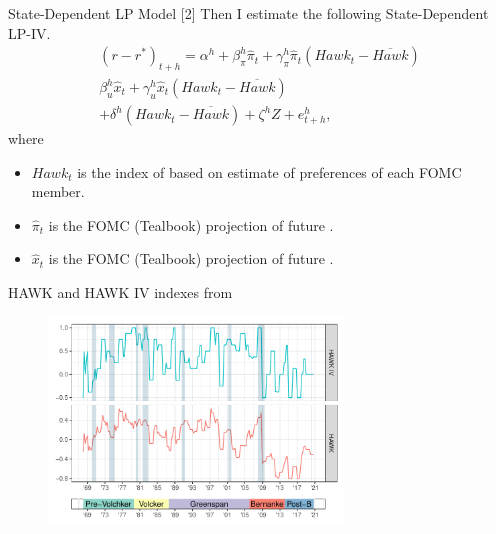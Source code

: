 \documentclass[10pt,aspectratio=169]{beamer}
\begin{document}
\begin{frame}{State-Dependent LP Model [2]}
    Then I estimate the following State-Dependent LP-IV.
    \begin{multline*}
        \left(r-r^*\right)_{t+h}=\alpha^h+\beta_\pi^h \hat\pi_t+\gamma_\pi^h \hat\pi_t\left(\mathit{Hawk}_{t}-\overline{\mathit{Hawk}}\right)\\ \beta_u^h \hat x_t+\gamma_u^h \hat x_t\left(\mathit{Hawk}_{t}-\overline{\mathit{Hawk}}\right)\\ +\delta^h\left(\mathit{Hawk}_{t}-\overline{\mathit{Hawk}}\right)+\zeta^hZ+e_{t+h}^h,
    \end{multline*}   \vspace{-3ex}
    where 
    \begin{itemize}
        \item $\mathit{Hawk}_t$ is the \cite{HIM2023} index of  based on \cite{Istrefi2019} estimate of preferences of each FOMC member.
        \item $\hat\pi_t$ is the FOMC (Tealbook) projection of future .
        \item $\hat x_t$ is the FOMC (Tealbook) projection of future .
    \end{itemize}
\end{frame}


\begin{frame}{HAWK and HAWK IV indexes from \cite{HIM2023}}
    \begin{figure}[h!]
        \includegraphics[width=0.7\textwidth]{HAWK_plot_w_heads.pdf}
    \end{figure}
\end{frame}
\end{document}

